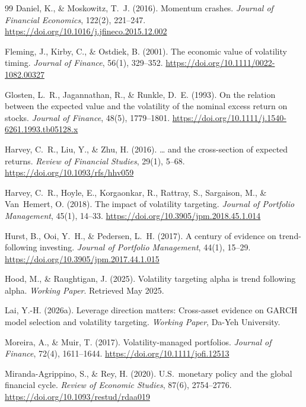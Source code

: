 \begin{thebibliography}{99}
Daniel, K., \& Moskowitz, T.~J. (2016). Momentum crashes. \textit{Journal of Financial Economics}, 122(2), 221--247. \url{https://doi.org/10.1016/j.jfineco.2015.12.002}

Fleming, J., Kirby, C., \& Ostdiek, B. (2001). The economic value of volatility timing. \textit{Journal of Finance}, 56(1), 329--352. \url{https://doi.org/10.1111/0022-1082.00327}

Glosten, L.~R., Jagannathan, R., \& Runkle, D.~E. (1993). On the relation between the expected value and the volatility of the nominal excess return on stocks. \textit{Journal of Finance}, 48(5), 1779--1801. \url{https://doi.org/10.1111/j.1540-6261.1993.tb05128.x}

Harvey, C.~R., Liu, Y., \& Zhu, H. (2016). \ldots{} and the cross-section of expected returns. \textit{Review of Financial Studies}, 29(1), 5--68. \url{https://doi.org/10.1093/rfs/hhv059}

Harvey, C.~R., Hoyle, E., Korgaonkar, R., Rattray, S., Sargaison, M., \& Van~Hemert, O. (2018). The impact of volatility targeting. \textit{Journal of Portfolio Management}, 45(1), 14--33. \url{https://doi.org/10.3905/jpm.2018.45.1.014}

Hurst, B., Ooi, Y.~H., \& Pedersen, L.~H. (2017). A century of evidence on trend-following investing. \textit{Journal of Portfolio Management}, 44(1), 15--29. \url{https://doi.org/10.3905/jpm.2017.44.1.015}

Hood, M., \& Raughtigan, J. (2025). Volatility targeting alpha is trend following alpha. \textit{Working Paper}. Retrieved May 2025.

Lai, Y.-H. (2026a). Leverage direction matters: Cross-asset evidence on GARCH model selection and volatility targeting. \textit{Working Paper}, Da-Yeh University.

Moreira, A., \& Muir, T. (2017). Volatility-managed portfolios. \textit{Journal of Finance}, 72(4), 1611--1644. \url{https://doi.org/10.1111/jofi.12513}

Miranda-Agrippino, S., \& Rey, H. (2020). U.S.\ monetary policy and the global financial cycle. \textit{Review of Economic Studies}, 87(6), 2754--2776. \url{https://doi.org/10.1093/restud/rdaa019}


\end{thebibliography}
